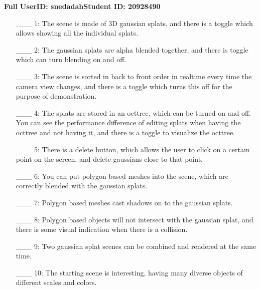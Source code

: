 \documentclass {article}
\begin{document}

{\hfill{\bf Full UserID: snedadah}\hfill{\bf Student ID: 20928490}\hfill}

\begin{enumerate}
     \item[\_\_\_ 1:] The scene is made of 3D gaussian splats, and there is a toggle which allows showing all the individual splats.
     
     \item[\_\_\_ 2:] The gaussian splats are alpha blended together, and there is toggle which can turn blending on and off.

     \item[\_\_\_ 3:] The scene is sorted in back to front order in realtime every time the camera view changes, and there is a toggle which turns this off for the purpose of demonstration.

     \item[\_\_\_ 4:] The splats are stored in an octtree, which can be turned on and off. You can see the performance difference of editing splats when having the octtree and not having it, and there is a toggle to visualize the octtree.

     \item[\_\_\_ 5:]  There is a delete button, which allows the user to click on a certain point on the screen, and delete gaussians close to that point.

     \item[\_\_\_ 6:] You can put polygon based meshes into the scene, which are correctly blended with the gaussian splats.

     \item[\_\_\_ 7:] Polygon based meshes cast shadows on to the gaussian splats.

     \item[\_\_\_ 8:] Polygon based objects will not intersect with the gaussian splat, and there is some visual indication when there is a collision.

     \item[\_\_\_ 9:]  Two gaussian splat scenes can be combined and rendered at the same time.

     \item[\_\_\_ 10:] The starting scene is interesting, having many diverse objects of different scales and colors.


\end{enumerate}

\end{document}
